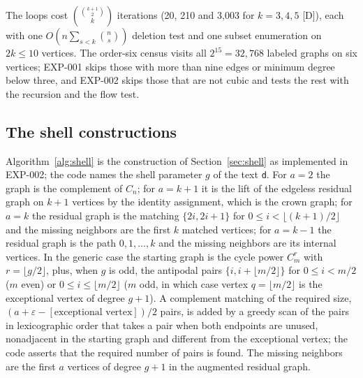\begin{algorithm}[t]
\caption{Exhaustive labeled residual enumeration for fixed $k$ (EXP-001, residual loop of \texttt{main})}\label{alg:residual}
\end{algorithm}

The loops cost $\binom{\binom{k+1}2}k$ iterations (20, 210 and 3,003 for $k=3,4,5$ [D]), each with one $O(n\sum_{s<k}\binom ns)$ deletion test and one subset enumeration on $2k\le10$ vertices.
The order-six census visits all $2^{15}=32{,}768$ labeled graphs on six vertices; EXP-001 skips those with more than nine edges or minimum degree below three, and EXP-002 skips those that are not cubic and tests the rest with the recursion and the flow test.

\subsection{The shell constructions}\label{sec:comp-shell}

Algorithm~\ref{alg:shell} is the construction of Section~\ref{sec:shell} as implemented in EXP-002; the code names the shell parameter $g$ of the text \texttt{d}.
For $a=2$ the graph is the complement of $C_n$; for $a=k+1$ it is the lift of the edgeless residual graph on $k+1$ vertices by the identity assignment, which is the crown graph; for $a=k$ the residual graph is the matching $\{2i,2i+1\}$ for $0\le i<\lfloor(k+1)/2\rfloor$ and the missing neighbors are the first $k$ matched vertices; for $a=k-1$ the residual graph is the path $0,1,\ldots,k$ and the missing neighbors are its internal vertices.
In the generic case the starting graph is the cycle power $C_m^r$ with $r=\lfloor g/2\rfloor$, plus, when $g$ is odd, the antipodal pairs $\{i,i+\lfloor m/2\rfloor\}$ for $0\le i<m/2$ ($m$ even) or $0\le i\le\lfloor m/2\rfloor$ ($m$ odd, in which case vertex $q=\lfloor m/2\rfloor$ is the exceptional vertex of degree $g+1$).
A complement matching of the required size, $(a+\varepsilon-[\text{exceptional vertex}])/2$ pairs, is added by a greedy scan of the pairs in lexicographic order that takes a pair when both endpoints are unused, nonadjacent in the starting graph and different from the exceptional vertex; the code asserts that the required number of pairs is found.
The missing neighbors are the first $a$ vertices of degree $g+1$ in the augmented residual graph.

